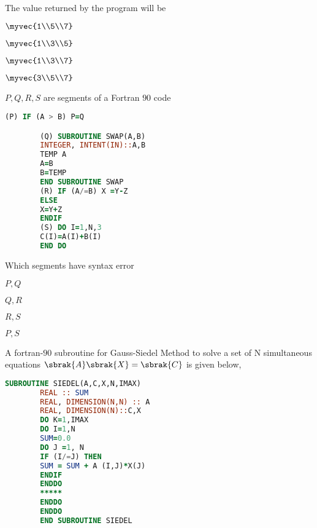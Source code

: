 		The value returned by the program will be
		\begin{enumerate}
		\end{enumerate}
	\item $P,Q,R,S$ are segments of a Fortran $90$ code
		\begin{lstlisting}[language=Fortran]
		(P) IF (A > B) P=Q

		(Q) SUBROUTINE SWAP(A,B)
		INTEGER, INTENT(IN)::A,B
		TEMP A
		A=B
		B=TEMP
		END SUBROUTINE SWAP
		(R) IF (A/=B) X =Y-Z
		ELSE
		X=Y+Z
		ENDIF
		(S) DO I=1,N,3
		C(I)=A(I)+B(I)
		END DO
		\end{lstlisting}
		Which segments have syntax error
		\begin{enumerate}
				\begin{multicols}{2}
				\item $P,Q$
					\columnbreak
				\item $Q,R$
				\end{multicols}
				\begin{multicols}{2}
				\item $R,S$
					\columnbreak
				\item $P,S$
				\end{multicols}
		\end{enumerate}
	\item A fortran-$90$ subroutine for Gauss-Siedel Method to solve a set of N simultaneous equations $ \sbrak{A} \sbrak{X}= \sbrak{C}$ is given below,
		\begin{lstlisting}[language=Fortran]
		SUBROUTINE SIEDEL(A,C,X,N,IMAX)
		REAL :: SUM
		REAL, DIMENSION(N,N) :: A
		REAL, DIMENSION(N)::C,X
		DO K=1,IMAX 
		DO I=1,N
		SUM=0.0
		DO J =1, N
		IF (I/=J) THEN
		SUM = SUM + A (I,J)*X(J)
		ENDIF
		ENDDO
		*****
		ENDDO
		ENDDO
		END SUBROUTINE SIEDEL
		\end{lstlisting}
